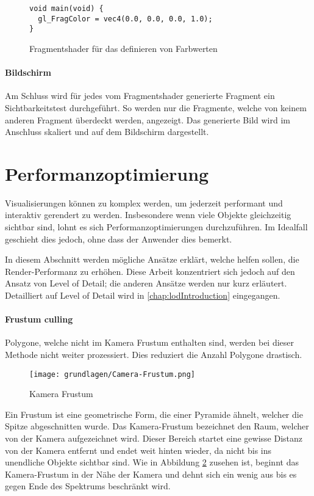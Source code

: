 \begin{figure}[H]
\begin{lstlisting}
void main(void) {
  gl_FragColor = vec4(0.0, 0.0, 0.0, 1.0);
}
\end{lstlisting}
\caption{Fragmentshader für das definieren von Farbwerten}
\label{fig:fragmentShader}
\end{figure}


\paragraph{Bildschirm}
Am Schluss wird für jedes vom Fragmentshader generierte Fragment ein Sichtbarkeitstest durchgeführt. So werden nur die Fragmente, welche von keinem anderen Fragment überdeckt werden, angezeigt. Das generierte Bild wird im Anschluss skaliert und auf dem Bildschirm dargestellt.


\section{Performanzoptimierung}
Visualisierungen können zu komplex werden, um jederzeit performant und interaktiv gerendert zu werden.
Insbesondere wenn viele Objekte gleichzeitig sichtbar sind, lohnt es sich Performanzoptimierungen durchzuführen.
Im Idealfall geschieht dies jedoch, ohne dass der Anwender dies bemerkt.

In diesem Abschnitt werden mögliche Ansätze erklärt, welche helfen sollen, die Render-Performanz zu erhöhen. Diese Arbeit konzentriert sich jedoch auf den Ansatz von Level of Detail; die anderen Ansätze werden nur kurz erläutert. Detailliert auf Level of Detail wird in \autoref{chap:lodIntroduction} eingegangen.

\paragraph{Frustum culling}
Polygone, welche nicht im Kamera Frustum enthalten sind, werden bei dieser Methode nicht weiter prozessiert.
Dies reduziert die Anzahl Polygone drastisch.

\begin{figure}[H]
  \centering
  \texttt{[image: grundlagen/Camera-Frustum.png]}
  \caption{Kamera Frustum}
  \label{fig:CameraFrustum}
\end{figure}

Ein Frustum ist eine geometrische Form, die einer Pyramide ähnelt, welcher die Spitze abgeschnitten wurde.
Das Kamera-Frustum bezeichnet den Raum, welcher von der Kamera aufgezeichnet wird. Dieser Bereich startet eine gewisse Distanz von der Kamera entfernt und endet weit hinten wieder, da nicht bis ins unendliche Objekte sichtbar sind.
Wie in Abbildung \ref{fig:CameraFrustum} zusehen ist, beginnt das Kamera-Frustum in der Nähe der Kamera und dehnt sich ein wenig aus bis es gegen Ende des Spektrums beschränkt wird.

